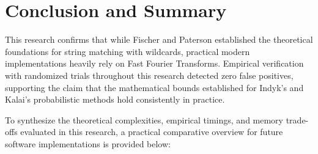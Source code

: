 \chapter{Conclusion and Summary}

This research confirms that while Fischer and Paterson established the theoretical foundations for string matching with wildcards, practical modern implementations heavily rely on Fast Fourier Transforms. Empirical verification with randomized trials throughout this research detected zero false positives, supporting the claim that the mathematical bounds established for Indyk's and Kalai's probabilistic methods hold consistently in practice.

To synthesize the theoretical complexities, empirical timings, and memory trade-offs evaluated in this research, a practical comparative overview for future software implementations is provided below:

